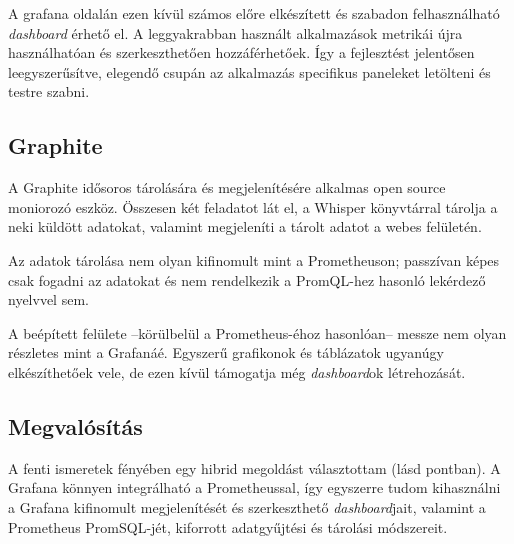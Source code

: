 A grafana oldalán ezen kívül számos előre elkészített és szabadon felhasználható \textit{dashboard} érhető el. A leggyakrabban használt alkalmazások metrikái újra használhatóan és szerkeszthetően hozzáférhetőek. Így a fejlesztést jelentősen leegyszerűsítve, elegendő csupán az alkalmazás specifikus paneleket letölteni és testre szabni.

\subsection{Graphite}
A Graphite idősoros tárolására és megjelenítésére alkalmas open source moniorozó eszköz. Összesen két feladatot lát el, a Whisper könyvtárral tárolja a neki küldött adatokat, valamint megjeleníti a tárolt adatot a webes felületén.

Az adatok tárolása nem olyan kifinomult mint a Prometheuson; passzívan képes csak fogadni az adatokat és nem rendelkezik a PromQL-hez hasonló lekérdező nyelvvel sem.

A beépített felülete --körülbelül a Prometheus-éhoz hasonlóan-- messze nem olyan részletes mint a Grafanáé. Egyszerű grafikonok és táblázatok ugyanúgy elkészíthetőek vele, de ezen kívül támogatja még \textit{dashboard}ok létrehozását.


\subsection{Megvalósítás}
A fenti ismeretek fényében egy hibrid megoldást választottam (lásd  pontban). A Grafana könnyen integrálható a Prometheussal, így egyszerre tudom kihasználni a Grafana kifinomult megjelenítését és szerkeszthető \textit{dashboard}jait, valamint a Prometheus PromSQL-jét, kiforrott adatgyűjtési és tárolási módszereit.